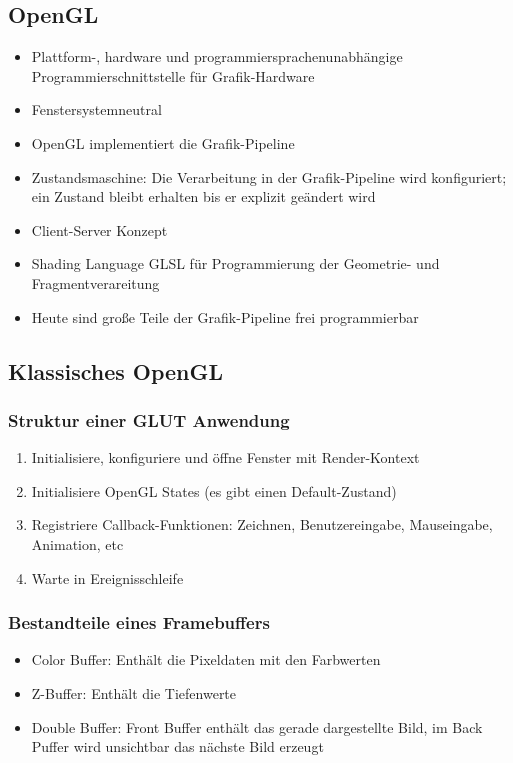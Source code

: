 \subsection{OpenGL}
\begin{itemize}
	\item Plattform-, hardware und programmiersprachenunabhängige Programmierschnittstelle für Grafik-Hardware
	\item Fenstersystemneutral
	\item OpenGL implementiert die Grafik-Pipeline
	\item Zustandsmaschine: Die Verarbeitung in der Grafik-Pipeline wird konfiguriert; ein Zustand bleibt erhalten bis er explizit geändert wird
	\item Client-Server Konzept
	\item Shading Language GLSL für Programmierung der Geometrie- und Fragmentverareitung
	\item Heute sind große Teile der Grafik-Pipeline frei programmierbar
\end{itemize}


\subsection{Klassisches OpenGL}

\subsubsection{Struktur einer GLUT Anwendung}
\begin{enumerate}
	\item Initialisiere, konfiguriere und öffne Fenster mit Render-Kontext
	\item Initialisiere OpenGL States (es gibt einen Default-Zustand)
	\item Registriere Callback-Funktionen: Zeichnen, Benutzereingabe, Mauseingabe, Animation, etc
	\item Warte in Ereignisschleife
\end{enumerate}

\subsubsection{Bestandteile eines Framebuffers}
\begin{itemize}
	\item Color Buffer: Enthält die Pixeldaten mit den Farbwerten
	\item Z-Buffer: Enthält die Tiefenwerte
	\item Double Buffer: Front Buffer enthält das gerade dargestellte Bild, im Back Puffer wird unsichtbar das nächste Bild erzeugt
\end{itemize}

